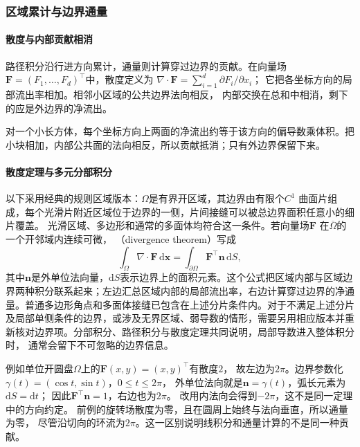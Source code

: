 \subsubsection{区域累计与边界通量}

\paragraph{散度与内部贡献相消}

路径积分沿行进方向累计，通量则计算穿过边界的贡献。在向量场
$\bm F=(F_1,\ldots,F_d)^\top$中，散度定义为
$\nabla\mathbin{\cdot}\bm F=\sum_{i=1}^d\partial F_i/\partial x_i$；
它把各坐标方向的局部流出率相加。相邻小区域的公共边界法向相反，
内部交换在总和中相消，剩下的应是外边界的净流出。


对一个小长方体，每个坐标方向上两面的净流出约等于该方向的偏导数乘体积。把小块相加，内部公共面的法向相反，所以贡献抵消；只有外边界保留下来。

\paragraph{散度定理与多元分部积分}

以下采用经典的规则区域版本：$\Omega$是有界开区域，其边界由有限个$C^1$
曲面片组成，每个光滑片附近区域位于边界的一侧，片间接缝可以被总边界面积任意小的细片覆盖。
光滑区域、多边形和通常的多面体均符合这一条件。若向量场$\bm{F}$
在$\overline{\Omega}$的一个开邻域内连续可微，
（divergence theorem）写成
\begin{equation}
  \int_{\Omega}\nabla\mathbin{\cdot}\bm{F}\,\mathrm{d}\bm{x}
  =
  \int_{\partial\Omega}\bm{F}^{\top}\bm{n}\,\mathrm{d}S,
\label{eq:analysis-divergence-theorem}
\end{equation}
其中$\bm{n}$是外单位法向量，$\mathrm dS$表示边界上的面积元素。这个公式把区域内部与区域边界两种积分联系起来；左边汇总区域内部的局部流出率，右边计算穿过边界的净通量。普通多边形角点和多面体接缝已包含在上述分片条件内。对于不满足上述分片及局部单侧条件的边界，或涉及无界区域、弱导数的情形，需要另用相应版本并重新核对边界项。分部积分、路径积分与散度定理共同说明，局部导数进入整体积分时， 通常会留下不可忽略的边界信息。

例如单位开圆盘$\Omega$上的$\bm F(x,y)=(x,y)^\top$有散度$2$，
故左边为$2\pi$。边界参数化$\gamma(t)=(\cos t,\sin t)$，$0\leq t\leq2\pi$，
外单位法向就是$\bm n=\gamma(t)$，弧长元素为$\mathrm dS=\mathrm dt$；
因此$\bm F^\top\bm n=1$，右边也为$2\pi$。
改用内法向会得到$-2\pi$，这不是同一定理中的方向约定。
前例的旋转场散度为零，且在圆周上始终与法向垂直，所以通量为零，
尽管沿切向的环流为$2\pi$。这一区别说明线积分和通量计算的不是同一种贡献。

